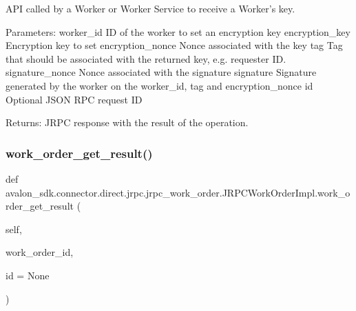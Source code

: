\begin{DoxyVerb}API called by a Worker or Worker Service to receive a Worker's key.

Parameters:
worker_id        ID of the worker to set an encryption key
encryption_key   Encryption key to set
encryption_nonce Nonce associated with the key
tag              Tag that should be associated with the returned key,
         e.g. requester ID.
signature_nonce  Nonce associated with the signature
signature        Signature generated by the worker on the worker_id,
         tag and encryption_nonce
id               Optional JSON RPC request ID

Returns:
JRPC response with the result of the operation.
\end{DoxyVerb}
 \mbox{\label{classavalon__sdk_1_1connector_1_1direct_1_1jrpc_1_1jrpc__work__order_1_1JRPCWorkOrderImpl_a29815c22c7833a206bbfa4ee3ef0b7a3}} 
\subsubsection{\texorpdfstring{work\+\_\+order\+\_\+get\+\_\+result()}{work\_order\_get\_result()}}
{\footnotesize\ttfamily def avalon\+\_\+sdk.\+connector.\+direct.\+jrpc.\+jrpc\+\_\+work\+\_\+order.\+J\+R\+P\+C\+Work\+Order\+Impl.\+work\+\_\+order\+\_\+get\+\_\+result (\begin{DoxyParamCaption}\item[{}]{self,  }\item[{}]{work\+\_\+order\+\_\+id,  }\item[{}]{id = {\ttfamily None} }\end{DoxyParamCaption})}

